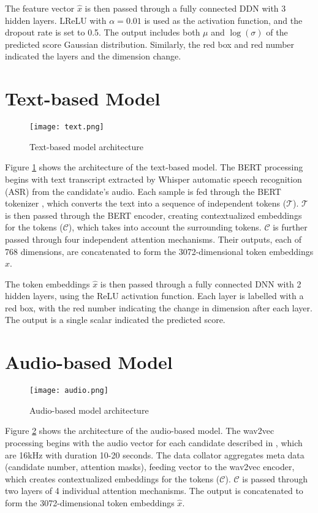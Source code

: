 The feature vector $\hat{x}$ is then passed through a fully connected DDN with 3 hidden layers. LReLU with $\alpha = 0.01$ is used as the activation function, and the dropout rate is set to 0.5. The output includes both $\mu$ and $\log(\sigma)$ of the predicted score Gaussian distribution. Similarly, the red box and red number indicated the layers and the dimension change.


\section{Text-based Model}
\begin{figure}[H]
    \centering
    \texttt{[image: text.png]}
    \caption{Text-based model architecture}
    \label{fig:text}
\end{figure}

Figure \ref{fig:text} shows the architecture of the text-based model. The BERT processing begins with text transcript extracted by Whisper automatic speech recognition (ASR) from the candidate's audio. Each sample is fed through the BERT tokenizer , which converts the text into a sequence of independent tokens ($\mathcal{T}$). $\mathcal{T}$ is then passed through the BERT encoder, creating contextualized embeddings for the tokens ($\mathcal{C}$), which takes into account the surrounding tokens. $\mathcal{C}$ is further passed through four independent attention mechanisms. Their outputs, each of 768 dimensions, are concatenated to form the 3072-dimensional token embeddings $\hat{x}$.

The token embeddings $\hat{x}$ is then passed through a fully connected DNN with 2 hidden layers, using the ReLU activation function. Each layer is labelled with a red box, with the red number indicating the change in dimension after each layer. The output is a single scalar indicated the predicted score.

\section{Audio-based Model}
\begin{figure}[H]
    \centering
    \texttt{[image: audio.png]}
    \caption{Audio-based model architecture}
    \label{fig:audio}
\end{figure}

Figure \ref{fig:audio} shows the architecture of the audio-based model. The wav2vec processing begins with the audio vector for each candidate described in \cite{graders}, which are 16kHz with duration 10-20 seconds. The data collator aggregates meta data (candidate number, attention masks), feeding vector to the wav2vec encoder, which creates contextualized embeddings for the tokens ($\mathcal{C}$). $\mathcal{C}$ is passed through two layers of 4 individual attention mechanisms. The output is concatenated to form the 3072-dimensional  token embeddings $\hat{x}$.

